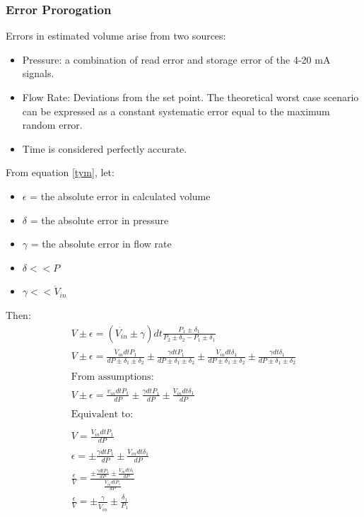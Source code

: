 \documentclass{report}
\begin{document}
\subsubsection{Error Prorogation}
Errors in estimated volume arise from two sources:
\begin{itemize}
\item{Pressure: a combination of read error and storage error of the 4-20 mA signals.}
\item{Flow Rate: Deviations from the set point. The theoretical worst case scenario can be expressed as a constant systematic error equal to the maximum random error.}
\item{Time is considered perfectly accurate.}
\end{itemize}
From equation \ref{tym}, let:
\begin{itemize}
\item{$\epsilon$ = the absolute error in calculated volume}
\item{$\delta$ = the absolute error in pressure}
\item{$\gamma$ = the absolute error in flow rate}
\item{$\delta << P$}
\item{$\gamma<< \dot{V}_{in}$}
\end{itemize}
Then:
\begin{eqnarray}
V \pm \epsilon= (\dot{V_{in}}\pm \gamma) dt \frac{P_1\pm \delta _1}{P_2 \pm \delta _2 - P_1 \pm\delta _1} \nonumber \\
V \pm \epsilon = \frac{\dot{V}_{in} dt P_1}{dP \pm \delta _1 \pm \delta _2} \pm \frac{\gamma dt P_1}{dP \pm \delta _1 \pm \delta _2}\pm\frac{\dot{V}_{in}dt \delta _1}{dP \pm \delta _1 \pm \nonumber \delta _2}\pm \frac{\gamma dt \delta _1}{dP \pm \delta _1 \pm \delta _2} \nonumber \\\\
\text{From assumptions: } \nonumber\\
V \pm \epsilon = \frac{\dot{v}_{in} dt P_1}{dP} \pm \frac{\gamma dt P_1}{dP}\pm\frac{\dot{V}_{in}dt \delta _1}{dP} \nonumber\\\\
\text{Equivalent to: } \nonumber \\ \\
V =  \frac{\dot{V}_{in} dt P_1}{dP} \nonumber \\ 
\epsilon = \pm \frac{\gamma dt P_1}{dP}\pm\frac{\dot{V}_{in}dt \delta _1}{dP} \nonumber\\
\frac{\epsilon}{V} = \frac{\pm \frac{\gamma dt P_1}{dP}\pm\frac{\dot{V}_{in}dt \delta _1}{dP}}{\frac{\dot{V}_{in} dt P_1}{dP}}\nonumber \\
\frac{\epsilon}{V} = \pm \frac{\gamma}{\dot{V}_{in}} \pm \frac{\delta _1}{P_1}\\
\end{eqnarray}
\end{document}
